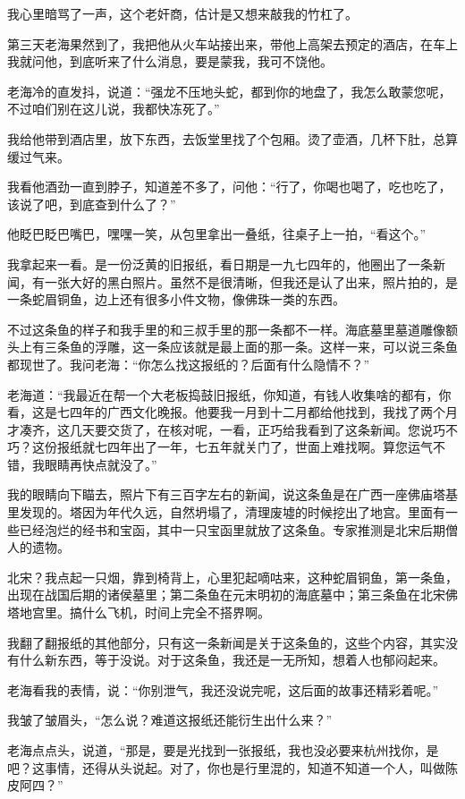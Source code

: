 我心里暗骂了一声，这个老奸商，估计是又想来敲我的竹杠了。

第三天老海果然到了，我把他从火车站接出来，带他上高架去预定的酒店，在车上我就问他，到底听来了什么消息，要是蒙我，我可不饶他。

老海冷的直发抖，说道：“强龙不压地头蛇，都到你的地盘了，我怎么敢蒙您呢，不过咱们别在这儿说，我都快冻死了。”

我给他带到酒店里，放下东西，去饭堂里找了个包厢。烫了壶酒，几杯下肚，总算缓过气来。

我看他酒劲一直到脖子，知道差不多了，问他：“行了，你喝也喝了，吃也吃了，该说了吧，到底查到什么了？”

他眨巴眨巴嘴巴，嘿嘿一笑，从包里拿出一叠纸，往桌子上一拍，“看这个。”

我拿起来一看。是一份泛黄的旧报纸，看日期是一九七四年的，他圈出了一条新闻，有一张大好的黑白照片。虽然不是很清晰，但我还是认了出来，照片拍的，是一条蛇眉铜鱼，边上还有很多小件文物，像佛珠一类的东西。

不过这条鱼的样子和我手里的和三叔手里的那一条都不一样。海底墓里墓道雕像额头上有三条鱼的浮雕，这一条应该就是最上面的那一条。这样一来，可以说三条鱼都现世了。我问老海：“你怎么找这报纸的？后面有什么隐情不？”

老海道：“我最近在帮一个大老板捣鼓旧报纸，你知道，有钱人收集啥的都有，你看，这是七四年的广西文化晚报。他要我一月到十二月都给他找到，我找了两个月才凑齐，这几天要交货了，在核对呢，一看，正巧给我看到了这条新闻。您说巧不巧？这份报纸就七四年出了一年，七五年就关门了，世面上难找啊。算您运气不错，我眼睛再快点就没了。”

我的眼睛向下瞄去，照片下有三百字左右的新闻，说这条鱼是在广西一座佛庙塔基里发现的。塔因为年代久远，自然坍塌了，清理废墟的时候挖出了地宫。里面有一些已经泡烂的经书和宝函，其中一只宝函里就放了这条鱼。专家推测是北宋后期僧人的遗物。

北宋？我点起一只烟，靠到椅背上，心里犯起嘀咕来，这种蛇眉铜鱼，第一条鱼，出现在战国后期的诸侯墓里；第二条鱼在元末明初的海底墓中；第三条鱼在北宋佛塔地宫里。搞什么飞机，时间上完全不搭界啊。

我翻了翻报纸的其他部分，只有这一条新闻是关于这条鱼的，这些个内容，其实没有什么新东西，等于没说。对于这条鱼，我还是一无所知，想着人也郁闷起来。

老海看我的表情，说：“你别泄气，我还没说完呢，这后面的故事还精彩着呢。”

我皱了皱眉头，“怎么说？难道这报纸还能衍生出什么来？”

老海点点头，说道，“那是，要是光找到一张报纸，我也没必要来杭州找你，是吧？这事情，还得从头说起。对了，你也是行里混的，知道不知道一个人，叫做陈皮阿四？”

